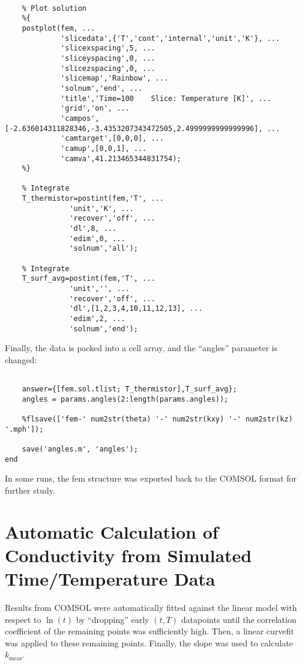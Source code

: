 \small
\begin{verbatim}

    % Plot solution
    %{
    postplot(fem, ...
             'slicedata',{'T','cont','internal','unit','K'}, ...
             'slicexspacing',5, ...
             'sliceyspacing',0, ...
             'slicezspacing',0, ...
             'slicemap','Rainbow', ...
             'solnum','end', ...
             'title','Time=100    Slice: Temperature [K]', ...
             'grid','on', ...
             'campos',[-2.636014311828346,-3.4353207343472505,2.4999999999999996], ...
             'camtarget',[0,0,0], ...
             'camup',[0,0,1], ...
             'camva',41.213465344831754);
    %}

    % Integrate
    T_thermistor=postint(fem,'T', ...
               'unit','K', ...
               'recover','off', ...
               'dl',8, ...
               'edim',0, ...
               'solnum','all');

    % Integrate
    T_surf_avg=postint(fem,'T', ...
               'unit','', ...
               'recover','off', ...
               'dl',[1,2,3,4,10,11,12,13], ...
               'edim',2, ...
               'solnum','end');
\end{verbatim}
\normalsize

Finally, the data is packed into a cell array, and the ``angles'' parameter
is changed:

\small
\begin{verbatim}

    answer={[fem.sol.tlist; T_thermistor],T_surf_avg};
    angles = params.angles(2:length(params.angles));

    %flsave(['fem-' num2str(theta) '-' num2str(kxy) '-' num2str(kz) '.mph']);

    save('angles.m', 'angles');
end
\end{verbatim}
\normalsize

In some runs, the fem structure was exported back to the COMSOL format for
further study.

\section{Automatic Calculation of Conductivity from Simulated Time/Temperature Data}

Results from COMSOL were automatically fitted against the linear model with
respect to \(\ln(t)\) by ``dropping'' early \((t,T)\) datapoints until the
correlation coefficient of the remaining points was sufficiently high. Then, a
linear curvefit was applied to these remaining points. Finally, the slope was
used to calculate \(k_{\textrm{meas}}\).

